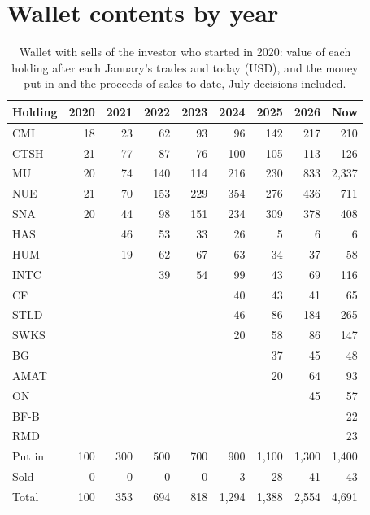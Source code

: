 \documentclass[11pt,a4paper]{article}
\begin{document}
\section{Wallet contents by year}
\label{app:contents}
\begin{table}[H]
\centering
\small
\caption{Wallet with sells of the investor who started in 2020: value of each holding after each January's trades and today (USD), and the money put in and the proceeds of sales to date, July decisions included.}\label{tab:contents}
\begin{tabular}{l r r r r r r r r }
\hline
Holding & 2020 & 2021 & 2022 & 2023 & 2024 & 2025 & 2026 & Now \\
\hline
CMI & 18 & 23 & 62 & 93 & 96 & 142 & 217 & 210 \\
CTSH & 21 & 77 & 87 & 76 & 100 & 105 & 113 & 126 \\
MU & 20 & 74 & 140 & 114 & 216 & 230 & 833 & 2,337 \\
NUE & 21 & 70 & 153 & 229 & 354 & 276 & 436 & 711 \\
SNA & 20 & 44 & 98 & 151 & 234 & 309 & 378 & 408 \\
HAS &  & 46 & 53 & 33 & 26 & 5 & 6 & 6 \\
HUM &  & 19 & 62 & 67 & 63 & 34 & 37 & 58 \\
INTC &  &  & 39 & 54 & 99 & 43 & 69 & 116 \\
CF &  &  &  &  & 40 & 43 & 41 & 65 \\
STLD &  &  &  &  & 46 & 86 & 184 & 265 \\
SWKS &  &  &  &  & 20 & 58 & 86 & 147 \\
BG &  &  &  &  &  & 37 & 45 & 48 \\
AMAT &  &  &  &  &  & 20 & 64 & 93 \\
ON &  &  &  &  &  &  & 45 & 57 \\
BF-B &  &  &  &  &  &  &  & 22 \\
RMD &  &  &  &  &  &  &  & 23 \\
\hline
Put in & 100 & 300 & 500 & 700 & 900 & 1,100 & 1,300 & 1,400 \\
Sold & 0 & 0 & 0 & 0 & 3 & 28 & 41 & 43 \\
Total & 100 & 353 & 694 & 818 & 1,294 & 1,388 & 2,554 & 4,691 \\
\hline
\end{tabular}
\end{table}
\end{document}
